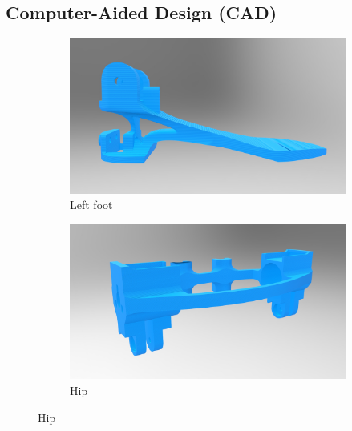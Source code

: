 \subsection{Computer-Aided Design (CAD)} %
\label{sub:computer_aided_design}

\begin{figure}
    \centering
    \begin{subfigure}[b]{0.49\textwidth}
        \includegraphics[width=\textwidth]{figures/legs_foot.jpg}
        \caption{Left foot}
        \label{fig:left_foot}
    \end{subfigure}
    \begin{subfigure}[b]{0.49\textwidth}
        \includegraphics[width=\textwidth]{figures/legs_hip.jpg}
        \caption{Hip}
        \label{fig:hip}
    \end{subfigure}


\end{figure}
